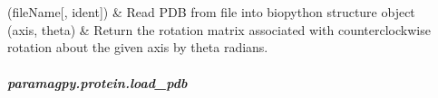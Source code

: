 \documentclass[a4paper,10pt,english]{sphinxmanual}
\begin{document}
\begin{savenotes}\sphinxatlongtablestart\begin{longtable}{}
\hline

\endfirsthead

%
{}\\
\hline

\endhead

\hline
{}\\
\endfoot

\endlastfoot

{\hyperref[\detokenize{reference/generated/paramagpy.protein.load_pdb:paramagpy.protein.load_pdb}]{}}(fileName{[}, ident{]})
&
Read PDB from file into biopython structure object
\\
\hline
{\hyperref[\detokenize{reference/generated/paramagpy.protein.rotation_matrix:paramagpy.protein.rotation_matrix}]{}}(axis, theta)
&
Return the rotation matrix associated with counterclockwise rotation about the given axis by theta radians.
\\
\hline
\end{longtable}\sphinxatlongtableend\end{savenotes}


\subparagraph{paramagpy.protein.load\_pdb}
\label{\detokenize{reference/generated/paramagpy.protein.load_pdb:paramagpy-protein-load-pdb}}\label{\detokenize{reference/generated/paramagpy.protein.load_pdb::doc}}
\end{document}
